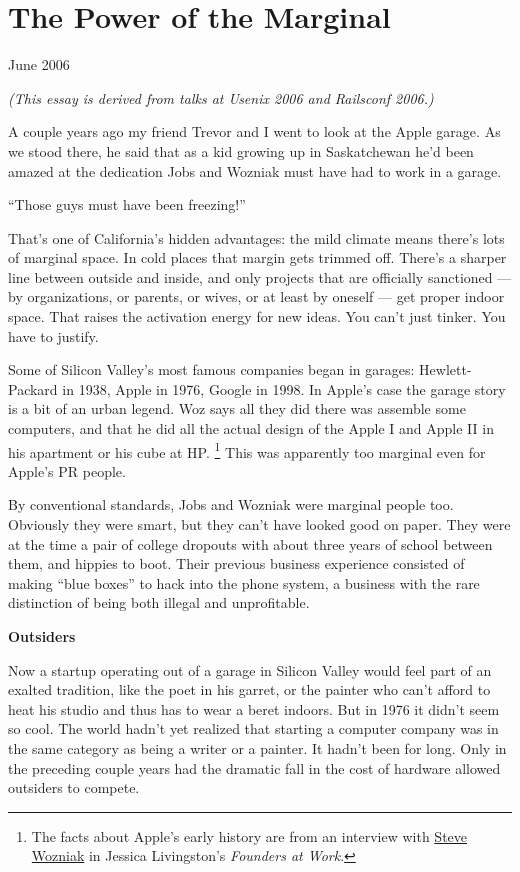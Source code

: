 \chapter{The Power of the Marginal}

June 2006

\emph{(This essay is derived from talks at Usenix 2006 and Railsconf
2006.)}

A couple years ago my friend Trevor and I went to look at the Apple
garage. As we stood there, he said that as a kid growing up in
Saskatchewan he'd been amazed at the dedication Jobs and Wozniak must
have had to work in a garage.

``Those guys must have been freezing!''

That's one of California's hidden advantages: the mild climate means
there's lots of marginal space. In cold places that margin gets trimmed
off. There's a sharper line between outside and inside, and only
projects that are officially sanctioned --- by organizations, or
parents, or wives, or at least by oneself --- get proper indoor space.
That raises the activation energy for new ideas. You can't just tinker.
You have to justify.

Some of Silicon Valley's most famous companies began in garages:
Hewlett-Packard in 1938, Apple in 1976, Google in 1998. In Apple's case
the garage story is a bit of an urban legend. Woz says all they did
there was assemble some computers, and that he did all the actual design
of the Apple I and Apple II in his apartment or his cube at HP.
\footnote{The facts about Apple's early history are from an interview with
\href{http://foundersatwork.com/steve-wozniak.html}{Steve Wozniak} in
Jessica Livingston's \emph{Founders at Work}.} This was apparently too marginal even for
Apple's PR people.

By conventional standards, Jobs and Wozniak were marginal people too.
Obviously they were smart, but they can't have looked good on paper.
They were at the time a pair of college dropouts with about three years
of school between them, and hippies to boot. Their previous business
experience consisted of making ``blue boxes'' to hack into the phone
system, a business with the rare distinction of being both illegal and
unprofitable.

\textbf{Outsiders}

Now a startup operating out of a garage in Silicon Valley would feel
part of an exalted tradition, like the poet in his garret, or the
painter who can't afford to heat his studio and thus has to wear a beret
indoors. But in 1976 it didn't seem so cool. The world hadn't yet
realized that starting a computer company was in the same category as
being a writer or a painter. It hadn't been for long. Only in the
preceding couple years had the dramatic fall in the cost of hardware
allowed outsiders to compete.

